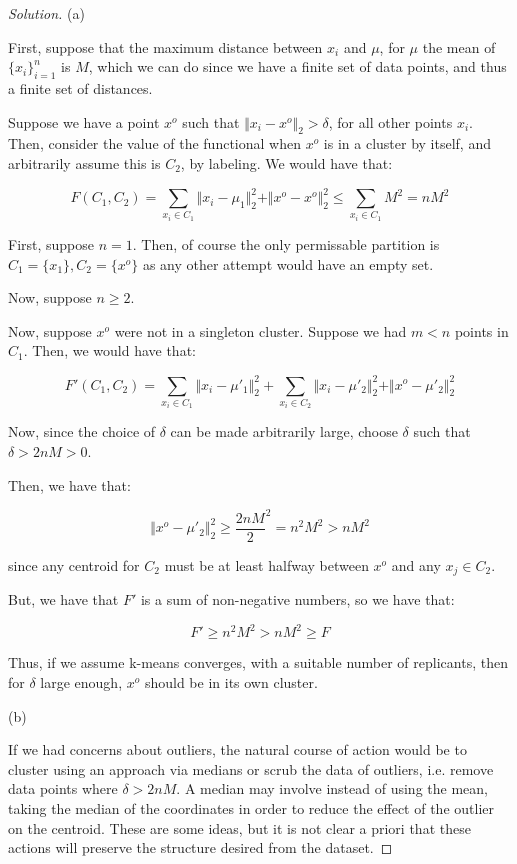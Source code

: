 \documentclass[10pt]{article}
\begin{document}
\begin{proof}[Solution]

(a)

First, suppose that the maximum distance between $x_i$ and $\mu$, for $\mu$ the mean of $\{ x_i \}_{i=1}^n$ is $M$, which we can do since we have a finite set of data points, and thus a finite set of distances.

Suppose we have a point $x^o$ such that $\Vert x_i  - x^o \Vert_2 > \delta$, for all other points $x_i$. Then, consider the value of the functional when $x^o$ is in a cluster by itself, and arbitrarily assume this is $C_2$, by labeling. We would have that:

$$ F(C_1,C_2) = \sum_{x_i \in C_1} \Vert x_i - \mu_1 \Vert_2^2 + \Vert x^o - x^o \Vert_2^2 \leq  \sum_{x_i \in C_1} M^2 = nM^2$$

First, suppose $n=1$. Then, of course the only permissable partition is $C_1 = \{ x_1 \}, C_2 = \{ x^o \}$ as any other attempt would have an empty set.

Now, suppose $n \geq 2$.

Now, suppose $x^o$ were not in a singleton cluster. Suppose we had $m < n$ points in $C_1$. Then, we would have that:

$$  F'(C_1,C_2) = \sum_{x_i \in C_1} \Vert x_i - \mu'_1 \Vert_2^2 + \sum_{x_i \in C_2} \Vert x_i - \mu'_2 \Vert_2^2 + \Vert x^o - \mu'_2 \Vert_2^2$$

Now, since the choice of $\delta$ can be made arbitrarily large, choose $\delta$ such that $\delta > 2nM > 0$.

Then, we have that:

$$ \Vert x^o - \mu'_2 \Vert_2^2 \geq \frac{2nM}{2}^2 = n^2M^2 > nM^2$$

since any centroid for $C_2$ must be at least halfway between $x^o$ and any $x_j \in C_2$.

But, we have that  $F'$ is a sum of non-negative numbers, so we have that:

$$ F' \geq n^2 M^2 > nM^2 \geq F$$

Thus, if we assume k-means converges, with a suitable number of replicants, then for $\delta$ large enough, $x^o$ should be in its own cluster.

(b)

If we had concerns about outliers, the natural course of action would be to cluster using an approach via medians or scrub the data of outliers, i.e. remove data points where $\delta > 2nM$. A median may involve instead of using the mean, taking the median of the coordinates in order to reduce the effect of the outlier on the centroid. These are some ideas, but it is not clear a priori that these actions will preserve the structure desired from the dataset.


\end{proof}
\end{document}
